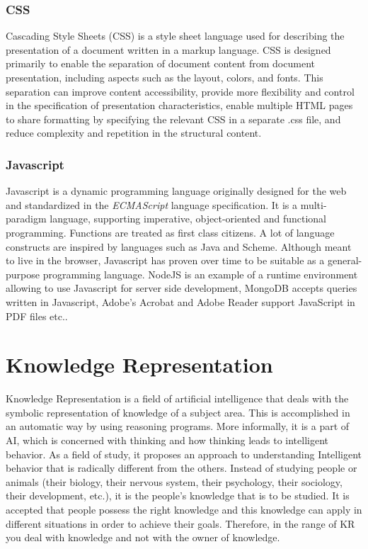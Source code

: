 \subsubsection{CSS}
Cascading Style Sheets (CSS) is a style sheet language used for describing the presentation of a document written in a markup language. CSS is designed primarily to enable the separation of document content from document presentation, including aspects such as the layout, colors, and fonts. This separation can improve content accessibility, provide more flexibility and control in the specification of presentation characteristics, enable multiple HTML pages to share formatting by specifying the relevant CSS in a separate .css file, and reduce complexity and repetition in the structural content.

\subsubsection{Javascript}

Javascript is a dynamic programming language originally designed for the web and standardized in the \textit{ECMAScript} language specification. It is a multi-paradigm language, supporting imperative, object-oriented and functional programming. Functions are treated as first class citizens. A lot of language constructs are inspired by languages such as Java and Scheme. Although meant to live in the browser, Javascript has proven over time to be suitable as a general-purpose programming language. NodeJS is an example of a runtime environment allowing to use Javascript for server side development, MongoDB accepts queries written in Javascript, Adobe's Acrobat and Adobe Reader support JavaScript in PDF files etc..

\section{Knowledge Representation}
Knowledge Representation is a field of artificial intelligence that deals with the symbolic representation of knowledge of a subject area. This is accomplished in an automatic way by using reasoning programs. More informally, it is a part of AI, which is concerned with thinking and how thinking leads to intelligent behavior. As a field of study, it proposes an approach to understanding Intelligent behavior that is radically different from the others. Instead of studying people or animals (their biology, their nervous system, their psychology, their sociology, their development, etc.), it is the people's knowledge that is to be studied. It is accepted that people possess the right knowledge and this knowledge can apply in different situations in order to achieve their goals. Therefore, in the range of KR you deal with knowledge and not with the owner of knowledge.

